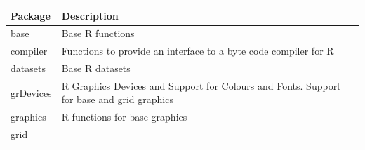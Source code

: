 \documentclass[]{book}
\theoremstyle{definition}
\theoremstyle{definition}
\theoremstyle{definition}
\theoremstyle{remark}
\begin{document}
\begin{longtable}[]{@{}ll@{}}
\toprule
\begin{minipage}[b]{0.13\columnwidth}\raggedright\strut
Package\strut
\end{minipage} & \begin{minipage}[b]{0.81\columnwidth}\raggedright\strut
Description\strut
\end{minipage}\tabularnewline
\midrule
\endhead
\begin{minipage}[t]{0.13\columnwidth}\raggedright\strut
base\strut
\end{minipage} & \begin{minipage}[t]{0.81\columnwidth}\raggedright\strut
Base R functions\strut
\end{minipage}\tabularnewline
\begin{minipage}[t]{0.13\columnwidth}\raggedright\strut
compiler\strut
\end{minipage} & \begin{minipage}[t]{0.81\columnwidth}\raggedright\strut
Functions to provide an interface to a byte code compiler for R\strut
\end{minipage}\tabularnewline
\begin{minipage}[t]{0.13\columnwidth}\raggedright\strut
datasets\strut
\end{minipage} & \begin{minipage}[t]{0.81\columnwidth}\raggedright\strut
Base R datasets\strut
\end{minipage}\tabularnewline
\begin{minipage}[t]{0.13\columnwidth}\raggedright\strut
grDevices\strut
\end{minipage} & \begin{minipage}[t]{0.81\columnwidth}\raggedright\strut
R Graphics Devices and Support for Colours and Fonts. Support for base
and grid graphics\strut
\end{minipage}\tabularnewline
\begin{minipage}[t]{0.13\columnwidth}\raggedright\strut
graphics\strut
\end{minipage} & \begin{minipage}[t]{0.81\columnwidth}\raggedright\strut
R functions for base graphics\strut
\end{minipage}\tabularnewline
\begin{minipage}[t]{0.13\columnwidth}\raggedright\strut
grid\strut
\end{minipage} & \begin{minipage}[t]{0.81\columnwidth}\raggedright\strut

\end{minipage}
\end{longtable}
\end{document}
